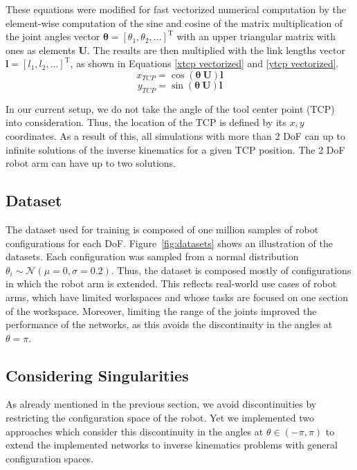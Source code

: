 \documentclass[conference]{IEEEtran}
\begin{document}
These equations were modified for fast vectorized numerical computation by the element-wise computation of the sine and cosine of the matrix multiplication of the joint angles vector \( \bm{\theta} = \left[ \theta_1, \theta_2 , ... \right]^\text{T} \) with an upper triangular matrix with ones as elements \( \bm{U} \). The results are then multiplied with the link lengths vector \( \bm{l} = \left[ l_1, l_2, ... \right]^\text{T} \), as shown in Equations \ref{xtcp vectorized} and \ref{ytcp vectorized}.
\begin{equation}
    x_{TCP} = \cos \left( \bm{\theta}\ \bm{U} \right) \bm{l}
    \label{xtcp vectorized}
\end{equation}
\begin{equation}
    y_{TCP} = \sin \left( \bm{\theta}\ \bm{U} \right) \bm{l}
    \label{ytcp vectorized}
\end{equation}

In our current setup, we do not take the angle of the tool center point (TCP) into consideration. Thus, the location of the TCP is defined by its \( x, y \) coordinates. As a result of this, all simulations with more than 2 DoF can up to infinite solutions of the inverse kinematics for a given TCP position. The 2 DoF robot arm can have up to two solutions.

\subsection*{Dataset}

The dataset used for training is composed of one million samples of robot configurations for each DoF. Figure~\ref{fig:datasets} shows an illustration of the datasets. Each configuration was sampled from a normal distribution $ \theta_i \sim \mathcal{N}(\mu=0, \sigma=0.2) $. Thus, the dataset is composed mostly of configurations in which the robot arm is extended. This reflects real-world use cases of robot arms, which have limited workspaces and whose tasks are focused on one section of the workspace. Moreover, limiting the range of the joints improved the performance of the networks, as this avoids the discontinuity in the angles at \( \theta = \pi \).


\subsection*{Considering Singularities}

As already mentioned in the previous section, we avoid discontinuities by restricting the configuration space of the robot. Yet we implemented two approaches which consider this discontinuity in the angles at $\theta \in (- \pi , \pi)$ to extend the implemented networks to inverse kinematics problems with general configuration spaces.
\end{document}
